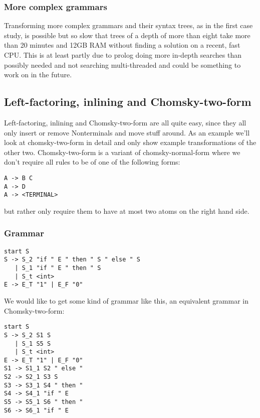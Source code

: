 \documentclass[a4paper]{article}
\begin{document}
\subsubsection*{More complex grammars}
Transforming more complex grammars and their syntax trees, as in the first case study, is possible but so slow that trees of a depth of more than eight take more than 20 minutes and 12GB RAM without finding a solution on a recent, fast CPU. This is at least partly due to prolog doing more in-depth searches than possibly needed and not searching multi-threaded and could be something to work on in the future.

\subsection*{Left-factoring, inlining and Chomsky-two-form}
Left-factoring, inlining and Chomsky-two-form are all quite easy, since they all only insert or remove Nonterminals and move stuff around. As an example we'll look at chomsky-two-form in detail and only show example transformations of the other two. Chomsky-two-form is a variant of chomsky-normal-form where we don't require all rules to be of one of the following forms:
\begin{verbatim}
A -> B C
A -> D
A -> <TERMINAL>
\end{verbatim}
but rather only require them to have at most two atoms on the right hand side.
\subsubsection*{Grammar}
\begin{lstlisting}[language=grammar]
start S
S -> S_2 "if " E " then " S " else " S 
   | S_1 "if " E " then " S 
   | S_t <int>
E -> E_T "1" | E_F "0"
\end{lstlisting}
We would like to get some kind of grammar like this, an equivalent grammar in Chomsky-two-form:
\begin{lstlisting}[language=grammar]
start S
S -> S_2 S1 S 
   | S_1 S5 S 
   | S_t <int>
E -> E_T "1" | E_F "0"
S1 -> S1_1 S2 " else "
S2 -> S2_1 S3 S
S3 -> S3_1 S4 " then "
S4 -> S4_1 "if " E
S5 -> S5_1 S6 " then "
S6 -> S6_1 "if " E
\end{lstlisting}
\end{document}
